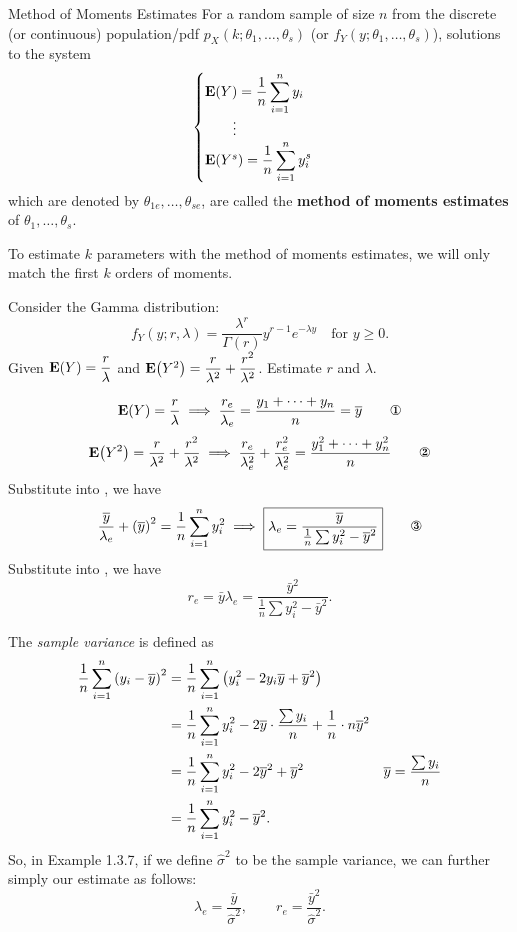 \begin{thm}{Method of Moments Estimates}
	For a random sample of size $n$ from the discrete (or continuous) population/pdf $p_X(k;\theta_1,\dots,\theta_s)$ (or $f_Y(y;\theta_1,\dots,\theta_s)$), solutions to the system \[\begin{cases}\vb{E}(Y)=\dfrac{1}{n}\displaystyle\sum_{i=1}^ny_i\\\qquad\vdots\\\vb{E}\qty(Y^s)=\dfrac{1}{n}\displaystyle\sum_{i=1}^ny_i^s\end{cases}\] which are denoted by $\theta_{1e},\dots,\theta_{se}$, are called the \textbf{method of moments estimates} of $\theta_1,\dots,\theta_s$.
\end{thm}
\begin{rmk}
	To estimate $k$ parameters with the method of moments estimates, we will only match the first $k$ orders of moments. 
\end{rmk}
\begin{eg}
	Consider the Gamma distribution: \[f_Y(y;r,\lambda)=\dfrac{\lambda^r}{\Gamma(r)}y^{r-1}e^{-\lambda y}\quad\text{for }y\geq0.\] Given $\vb{E}(Y)=\dfrac{r}{\lambda}$ and $\vb{E}\qty(Y^2)=\dfrac{r}{\lambda^2}+\dfrac{r^2}{\lambda^2}$. Estimate $r$ and $\lambda$.
	\begin{sol}
		\[\E\qty(Y)=\dfrac{r}{\lambda}\implies\dfrac{r_e}{\lambda_e}=\dfrac{y_1+\cdots+y_n}{n}=\bar{y}\qquad\text{\ding{172}}\] \[\E\qty(Y^2)=\dfrac{r}{\lambda^2}+\dfrac{r^2}{\lambda^2}\implies\dfrac{r_e}{\lambda_e^2}+\dfrac{r_e^2}{\lambda_e^2}=\dfrac{y_1^2+\cdots+y_n^2}{n}\qquad\text{\ding{173}}\] Substitute  into , we have \[\dfrac{\bar{y}}{\lambda_e}+\qty(\bar{y})^2=\dfrac{1}{n}\sum_{i=1}^ny_i^2\implies \boxed{\lambda_e=\dfrac{\bar{y}}{\frac{1}{n}\sum y_i^2-\bar{y}^2}}\qquad\text{\ding{174}}\] Substitute  into , we have \[r_e=\bar{y}\lambda_e=\boxed{\dfrac{\bar{y}^2}{\frac{1}{n}\sum y_i^2-\bar{y}^2}}.\]
	\end{sol}
\end{eg}
\begin{rmk}
	The \emph{sample variance} is defined as \begin{align*}\dfrac{1}{n}\sum_{i=1}^n\qty(y_i-\overline{y})^2&=\dfrac{1}{n}\sum_{i=1}^n\qty(y_i^2-2y_i\overline{y}+\overline{y}^2)\\&=\dfrac{1}{n}\sum_{i=1}^ny_i^2-2\overline{y}\cdot\dfrac{\sum y_i}{n}+\dfrac{1}{n}\cdot n\overline{y}^2\\&=\dfrac{1}{n}\sum_{i=1}^ny_i^2-2\overline{y}^2+\overline{y}^2&\overline{y}=\dfrac{\sum y_i}{n}\\&=\dfrac{1}{n}\sum_{i=1}^ny_i^2-\overline{y}^2.\end{align*} So, in Example 1.3.7, if we define $\hat{\sigma}^2$ to be the sample variance, we can further simply our estimate as follows: \[\lambda_e=\dfrac{\bar{y}}{\hat{\sigma}^2},\qquad r_e=\dfrac{\bar{y}^2}{\hat{\sigma}^2}.\]
\end{rmk}

